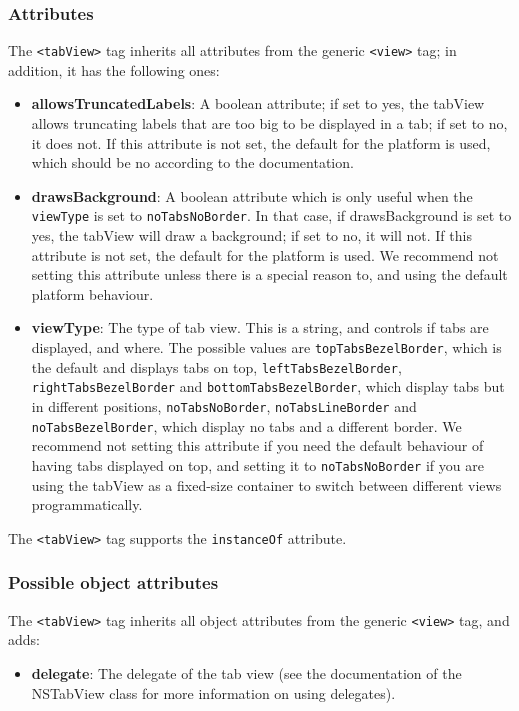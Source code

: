 \subsubsection{Attributes}
The \texttt{<tabView>} tag inherits all attributes from the generic
\texttt{<view>} tag; in addition, it has the following ones:
\begin{itemize}
\item {\bf allowsTruncatedLabels}: A boolean attribute; if set to yes,
  the tabView allows truncating labels that are too big to be
  displayed in a tab; if set to no, it does not.  If this attribute is
  not set, the default for the platform is used, which should be no
  according to the documentation.
\item {\bf drawsBackground}: A boolean attribute which is only useful
  when the \texttt{viewType} is set to \texttt{noTabsNoBorder}.  In
  that case, if drawsBackground is set to yes, the tabView will draw a
  background; if set to no, it will not.  If this attribute is not
  set, the default for the platform is used.  We recommend not setting
  this attribute unless there is a special reason to, and using the
  default platform behaviour.
\item {\bf viewType}: The type of tab view.  This is a string, and
  controls if tabs are displayed, and where.  The possible values are
  \texttt{topTabsBezelBorder}, which is the default and displays tabs
  on top, \texttt{leftTabsBezelBorder}, \texttt{rightTabsBezelBorder}
  and \texttt{bottomTabsBezelBorder}, which display tabs but in
  different positions, \texttt{noTabsNoBorder},
  \texttt{noTabsLineBorder} and \texttt{noTabsBezelBorder}, which
  display no tabs and a different border.  We recommend not setting
  this attribute if you need the default behaviour of having tabs
  displayed on top, and setting it to \texttt{noTabsNoBorder} if you
  are using the tabView as a fixed-size container to switch between
  different views programmatically.
\end{itemize}

The \texttt{<tabView>} tag supports the \texttt{instanceOf} attribute.

\subsubsection{Possible object attributes}
The \texttt{<tabView>} tag inherits all object attributes from the
generic \texttt{<view>} tag, and adds:
\begin{itemize}
\item {\bf delegate}: The delegate of the tab view (see the
  documentation of the NSTabView class for more information on using
  delegates).
\end{itemize}

